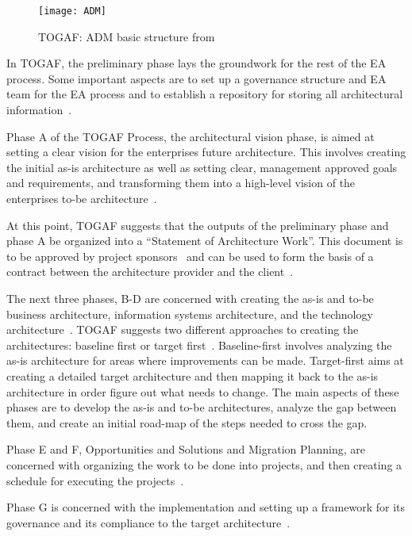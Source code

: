 \begin{figure}
\centering
\texttt{[image: ADM]}
\caption{TOGAF: ADM basic structure from \cite[Sec. 5.2.2]{togaf9.1}}
\label{fig:ADM}
\end{figure}

In TOGAF, the preliminary phase lays the groundwork for the rest of the EA process. Some important aspects are to set up a governance structure and EA team for the EA process and to establish a repository for storing all architectural information~\cite[Ch. 6]{togaf9.1}.

Phase A of the TOGAF Process, the architectural vision phase, is aimed at setting a clear vision for the enterprises future architecture. This involves creating the initial as-is architecture as well as setting clear, management approved goals and requirements, and transforming them into a high-level vision of the enterprises to-be architecture~\cite[Ch. 7]{togaf9.1}.

At this point, TOGAF suggests that the outputs of the preliminary phase and phase A be organized into a ``Statement of Architecture Work''. This document is to be approved by project sponsors~\cite[Sec. 7.4.11]{togaf9.1} and can be used to form the basis of a contract between the architecture provider and the client~\cite[Sec. 36.2.20]{togaf9.1}.

The next three phases, B-D are concerned with creating the as-is and to-be business architecture, information systems architecture, and the technology architecture~\cite[Ch.8-12]{togaf9.1}. TOGAF suggests two different approaches to creating the architectures: baseline first or target first~\cite[Ch. 19.4]{togaf9.1}. Baseline-first involves analyzing the as-is architecture for areas where improvements can be made. Target-first aims at creating a detailed target architecture and then mapping it back to the as-is architecture in order figure out what needs to change. The main aspects of these phases are to develop the as-is and to-be architectures, analyze the gap between them, and create an initial road-map of the steps needed to cross the gap.

Phase E and F, Opportunities and Solutions and Migration Planning, are concerned with organizing the work to be done into projects, and then creating a schedule for executing the projects~\cite[Ch. 13-14]{togaf9.1}.

Phase G is concerned with the implementation and setting up a framework for its governance and its compliance to the target architecture~\cite[Ch. 15]{togaf9.1}.

